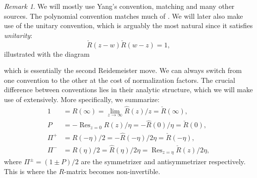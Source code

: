 \documentclass[11pt]{report}
\theoremstyle{definition}
\theoremstyle{remark}
\newtheorem*{remark}{Remark}
\theoremstyle{remark}
\begin{document}
\begin{remark}
We will mostly use Yang's convention, matching \cite{book:molev} and many other sources. The polynomial convention matches much of \cite{book:arutyunov:betheAnsatz}. We will later also make use of the unitary convention, which is arguably the most natural since it satisfies \emph{unitarity}:
\begin{equation*}
\check R(z-w) \check{R}(w-z) = 1,
\end{equation*}
illustrated with the diagram
~\\
\begin{center}
\end{center}
which is essentially the second Reidemeister move. We can always switch from one convention to the other at the cost of normalization factors. The crucial difference between conventions lies in their analytic structure, which we will make use of extensively. More specifically, we summarize:
\begin{align*}
1 &= R(\infty) = \lim_{z \to \infty} \hat{R}(z)/z = \check R(\infty), \\
P &= -\operatorname{Res}_{z=0} R(z)/\eta = -\hat{R}(0)/\eta = \check R(0), \\
\Pi^+ &= R(-\eta)/2 = -\hat{R}(-\eta)/2\eta = \check R(-\eta), \\
\Pi^- &= R(\eta)/2 = \hat{R}(\eta)/2\eta = \operatorname{Res}_{z=\eta} \check R(z)/2\eta,
\end{align*}
where $\Pi^\pm = (1 \pm P)/2$ are the symmetrizer and antisymmetrizer respectively. This is where the $R$-matrix becomes non-invertible.
\end{remark}
\end{document}
